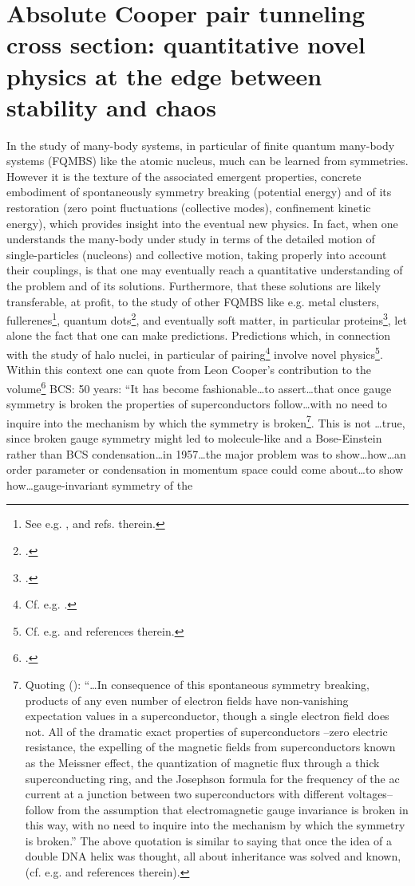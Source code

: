 \section[Absolute Cooper pair tunneling cross section]{Absolute Cooper pair tunneling cross section: quantitative novel physics at the edge between stability and chaos}\label{App3C}
In the study of many-body systems, in particular of finite quantum many-body systems (FQMBS) like the atomic nucleus, much can be learned from symmetries.  However it is the texture of the associated emergent properties, concrete embodiment of spontaneously symmetry breaking (potential energy) and of its restoration (zero point fluctuations (collective modes), confinement kinetic energy), which provides insight into the eventual new physics. In fact, when one understands the many-body under study in terms of the detailed motion of single-particles (nucleons) and collective motion, taking properly into account their couplings, is that one  may eventually reach a  quantitative understanding of the problem and of its solutions. Furthermore, that these solutions are likely transferable, at profit, to the study of other FQMBS like e.g. metal clusters, fullerenes\footnote{See e.g. \cite{Gunnarsson:04}, \cite{Broglia:04b} and refs. therein.}, quantum dots\footnote{\cite{Lipparini:03}.}, and eventually soft matter, in particular proteins\footnote{\cite{Broglia:13b}.}, let alone the fact that one can make predictions. Predictions which, in connection with the study of halo nuclei, in particular of pairing\footnote{Cf. e.g. \cite{Broglia:13}.} involve  novel physics\footnote{Cf. e.g. \cite{Barranco:01,Tanihata:08,Potel:10} and references therein.}. Within this context one can quote from Leon Cooper's contribution to the volume\footnote{\cite{Cooper:11}.} BCS: 50 years: ``It has become fashionable\dots to assert\dots that once gauge symmetry is broken the properties of superconductors follow\dots with no need to inquire into the mechanism by which the symmetry is broken\footnote{Quoting (\cite{Weinberg:11}): ``\dots In consequence of this spontaneous symmetry breaking, products of any even number of electron fields have non-vanishing expectation values in a superconductor, though a single electron field does not. All of the dramatic exact properties of superconductors --zero electric resistance, the expelling of the magnetic fields from superconductors known as the Meissner effect, the quantization of magnetic flux through a thick superconducting ring, and the Josephson formula for the frequency of the ac current at a junction between two superconductors with different voltages-- follow from the assumption that electromagnetic gauge invariance is broken in this way, with no need to inquire into the mechanism by which the symmetry is broken.'' The above quotation is similar to saying that once the idea of a double DNA helix was thought, all about inheritance was solved and known, (cf. e.g. \cite{Stent:80} and references therein).}. This is not \dots true, since broken gauge symmetry might led to molecule-like and a Bose-Einstein rather than BCS condensation\dots in 1957\dots the major problem was to show\dots how\dots an order parameter or condensation in momentum space could come about\dots to show how\dots gauge-invariant symmetry of the 